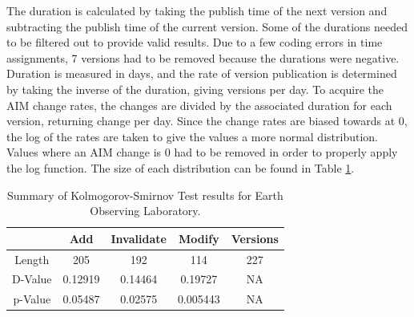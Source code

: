 The duration is calculated by taking the publish time of the next version and subtracting the publish time of the current version.
Some of the durations needed to be filtered out to provide valid results.  
Due to a few coding errors in time assignments, 7 versions had to be removed because the durations were negative.  
Duration is measured in days, and the rate of version publication is determined by taking the inverse of the duration, giving versions per day.  
To acquire the AIM change rates, the changes are divided by the associated duration for each version, returning change per day.  
Since the change rates are biased towards at 0, the log of the rates are taken to give the values a more normal distribution.  
Values where an AIM change is 0 had to be removed in order to properly apply the log function.  
The size of each distribution can be found in Table \ref{table:Eol_KS}.
\begin{table}
	\caption{Summary of Kolmogorov-Smirnov Test results for Earth Observing Laboratory.}
	\label{table:Eol_KS}
	\centering
	\begin{tabular}{|c|c|c|c|c|}
		\hline
		&	Add&	Invalidate&	Modify&	Versions\\ \hline
		Length&	205&	192&	114&	227\\
		D-Value&	0.12919&	0.14464&	0.19727&	NA\\
		p-Value&	0.05487&	0.02575&	0.005443&	NA\\
		\hline
	\end{tabular}
\end{table}

